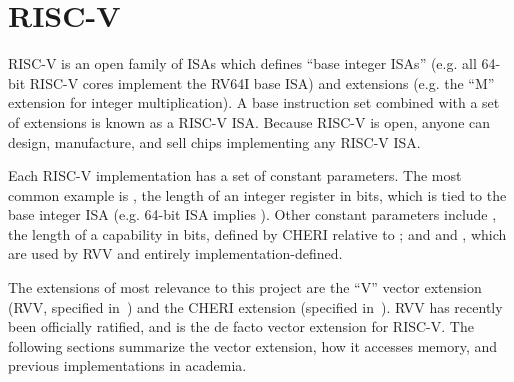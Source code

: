 \section{RISC-V}\label{chap:bg:sec:riscv}
RISC-V is an open family of ISAs which defines ``base integer ISAs'' (e.g. all 64-bit RISC-V cores implement the RV64I base ISA) and extensions (e.g. the ``M'' extension for integer multiplication).
A base instruction set combined with a set of extensions is known as a RISC-V ISA.
Because RISC-V is open, anyone can design, manufacture, and sell chips implementing any RISC-V ISA.

Each RISC-V implementation has a set of constant parameters.
The most common example is , the length of an integer register in bits, which is tied to the base integer ISA (e.g. 64-bit ISA implies ).
Other constant parameters include , the length of a capability in bits, defined by CHERI relative to ; and  and , which are used by RVV and entirely implementation-defined.

The extensions of most relevance to this project are the ``V'' vector extension (RVV, specified in~\cite{specification-RVV-v1.0}) and the CHERI extension (specified in~\cite{TR-951}).
RVV has recently been officially ratified, and is the de facto vector extension for RISC-V.
The following sections summarize the vector extension, how it accesses memory, and previous implementations in academia.

